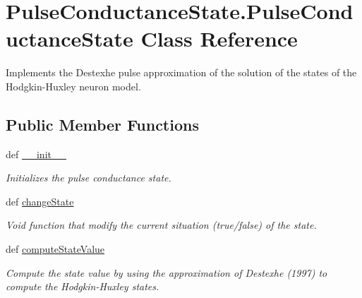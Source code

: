 \hypertarget{class_pulse_conductance_state_1_1_pulse_conductance_state}{\section{Pulse\-Conductance\-State.\-Pulse\-Conductance\-State Class Reference}
\label{class_pulse_conductance_state_1_1_pulse_conductance_state}
}


Implements the Destexhe pulse approximation of the solution of the states of the Hodgkin-\/\-Huxley neuron model.  


\subsection*{Public Member Functions}
\begin{DoxyCompactItemize}
\item 
def \hyperlink{class_pulse_conductance_state_1_1_pulse_conductance_state_a21c7b2a5374d272d27296ea8bc968f36}{\-\_\-\-\_\-init\-\_\-\-\_\-}
\begin{DoxyCompactList}\small\item\em Initializes the pulse conductance state. \end{DoxyCompactList}\item 
def \hyperlink{class_pulse_conductance_state_1_1_pulse_conductance_state_ac1ee5a9b9dc0ad6aa8e86052aa17268f}{change\-State}
\begin{DoxyCompactList}\small\item\em Void function that modify the current situation (true/false) of the state. \end{DoxyCompactList}\item 
def \hyperlink{class_pulse_conductance_state_1_1_pulse_conductance_state_ae81d1a5bbbf4fd80db0ded06631bd9c2}{compute\-State\-Value}
\begin{DoxyCompactList}\small\item\em Compute the state value by using the approximation of Destexhe (1997) to compute the Hodgkin-\/\-Huxley states. \end{DoxyCompactList}\end{DoxyCompactItemize}
